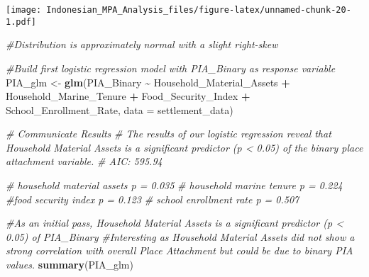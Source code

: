 \documentclass[
]{article}
\newenvironment{Shaded}{\begin{snugshade}}{\end{snugshade}}
\newcommand{\AttributeTok}[1]{\textcolor[rgb]{0.13,0.29,0.53}{#1}}
\newcommand{\CommentTok}[1]{\textcolor[rgb]{0.56,0.35,0.01}{\textit{#1}}}
\newcommand{\DecValTok}[1]{\textcolor[rgb]{0.00,0.00,0.81}{#1}}
\newcommand{\FunctionTok}[1]{\textcolor[rgb]{0.13,0.29,0.53}{\textbf{#1}}}
\newcommand{\NormalTok}[1]{#1}
\newcommand{\OtherTok}[1]{\textcolor[rgb]{0.56,0.35,0.01}{#1}}
\newcommand{\SpecialCharTok}[1]{\textcolor[rgb]{0.81,0.36,0.00}{\textbf{#1}}}
\begin{document}
\texttt{[image: Indonesian\_MPA\_Analysis\_files/figure-latex/unnamed-chunk-20-1.pdf]}

\begin{Shaded}
\begin{Highlighting}[]
\CommentTok{\#Distribution is approximately normal with a slight right{-}skew}
\end{Highlighting}
\end{Shaded}

\begin{Shaded}
\end{Shaded}

\begin{Shaded}
\begin{Highlighting}[]
\CommentTok{\#Build first logistic regression model with PIA\_Binary as response variable}
\NormalTok{PIA\_glm }\OtherTok{\textless{}{-}} \FunctionTok{glm}\NormalTok{(PIA\_Binary }\SpecialCharTok{\textasciitilde{}}\NormalTok{  Household\_Material\_Assets }\SpecialCharTok{+}\NormalTok{ Household\_Marine\_Tenure }\SpecialCharTok{+}\NormalTok{ Food\_Security\_Index }\SpecialCharTok{+}\NormalTok{ School\_Enrollment\_Rate, }\AttributeTok{data =}\NormalTok{ settlement\_data)}
\end{Highlighting}
\end{Shaded}

\begin{Shaded}
\begin{Highlighting}[]
\CommentTok{\# Communicate Results}
\CommentTok{\# The results of our logistic regression reveal that Household Material Assets is a significant predictor (p \textless{} 0.05) of the binary place attachment variable.}
\CommentTok{\# AIC: 595.94}

\CommentTok{\# household material assets p = 0.035}
\CommentTok{\# household marine tenure p = 0.224}
\CommentTok{\#food security index p = 0.123}
\CommentTok{\# school enrollment rate p  = 0.507}

\CommentTok{\#As an initial pass, Household Material Assets is a significant predictor (p \textless{} 0.05) of PIA\_Binary}
\CommentTok{\#Interesting as Household Material Assets did not show a strong correlation with overall Place Attachment but could be due to binary PIA values.}
\FunctionTok{summary}\NormalTok{(PIA\_glm)}
\end{Highlighting}
\end{Shaded}
\end{document}
